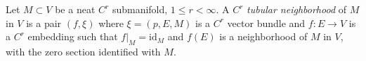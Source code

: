 Let $M \subset V$ be a neat $C^r$ submanifold, $1 \leqslant r < \infty$. A $C^r$ \textit{tubular neighborhood} of $M$ in $V$ is a pair $(f, \xi)$ where $\xi = (p, E, M)$ is a $C^r$ vector bundle and $f: E \to V$ is a $C^r$ embedding such that $f|_M = \mathrm{id}_M$ and $f(E)$ is a neighborhood of $M$ in $V$, with the zero section identified with $M$.
